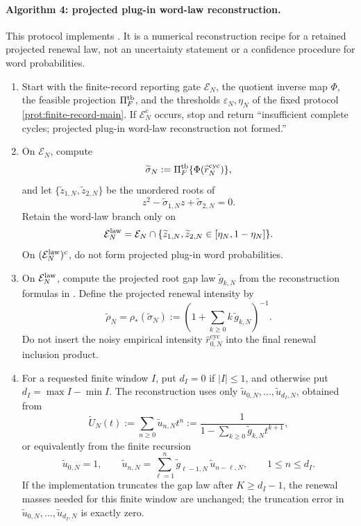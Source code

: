 \label{alg:projected-plugin-word-law-reconstruction-main}
\paragraph{Algorithm 4: projected plug-in word-law reconstruction.}

This protocol implements
.
It is a numerical reconstruction recipe for a retained projected renewal law,
not an uncertainty statement or a confidence procedure for word probabilities.

\begin{enumerate}[label=\textup{\arabic*.},leftmargin=2.0em,itemsep=0.35em]
\item Start with the finite-record reporting gate \(\mathcal E_N\), the
quotient inverse map \(\Phi\), the feasible projection \(\Pi_F^{\rm tb}\),
and the thresholds \(\varepsilon_N,\eta_N\) of the fixed protocol
\eqref{prot:finite-record-main}.  If \(\mathcal E_N^c\) occurs, stop and
return ``insufficient complete cycles; projected plug-in word-law
reconstruction not formed.''

\item On \(\mathcal E_N\), compute
\[
\widetilde\sigma_N
:=\Pi_F^{\rm tb}\{\Phi(\widehat r_N^{\mathrm{cyc}})\},
\]
and let \(\{\widetilde z_{1,N},\widetilde z_{2,N}\}\) be the unordered roots of
\[
z^2-\widetilde\sigma_{1,N}z+\widetilde\sigma_{2,N}=0 .
\]
Retain the word-law branch only on
\[
\mathcal E_N^{\rm law}
=\mathcal E_N\cap
\{\widetilde z_{1,N},\widetilde z_{2,N}\in[\eta_N,1-\eta_N]\}.
\]
On \((\mathcal E_N^{\rm law})^c\), do not form projected plug-in word
probabilities.

\item On \(\mathcal E_N^{\rm law}\), compute the projected root gap law
\(\widetilde g_{k,N}\) from the reconstruction formulas in
.  Define the projected
renewal intensity by
\[
\widetilde\rho_N
=\rho_*(\widetilde\sigma_N)
:=\left(1+\sum_{k\ge0}k\,\widetilde g_{k,N}\right)^{-1}.
\]
Do not insert the noisy empirical intensity
\(\widehat r_{0,N}^{\mathrm{cyc}}\) into the final renewal inclusion product.

\item For a requested finite window \(I\), put \(d_I=0\) if \(|I|\le1\), and
otherwise put \(d_I=\max I-\min I\).  The reconstruction uses only
\(\widetilde u_{0,N},\ldots,\widetilde u_{d_I,N}\), obtained from
\[
\widetilde U_N(t):=\sum_{n\ge0}\widetilde u_{n,N}t^n
:=\frac{1}{1-\sum_{k\ge0}\widetilde g_{k,N}t^{k+1}},
\]
or equivalently from the finite recursion
\[
\widetilde u_{0,N}=1,\qquad
\widetilde u_{n,N}
=\sum_{\ell=1}^{n}\widetilde g_{\ell-1,N}\,
  \widetilde u_{n-\ell,N},\qquad 1\le n\le d_I .
\]
If the implementation truncates the gap law after \(K\ge d_I-1\), the renewal
masses needed for this finite window are unchanged; the truncation error in
\(\widetilde u_{0,N},\ldots,\widetilde u_{d_I,N}\) is exactly zero.


\end{enumerate}
